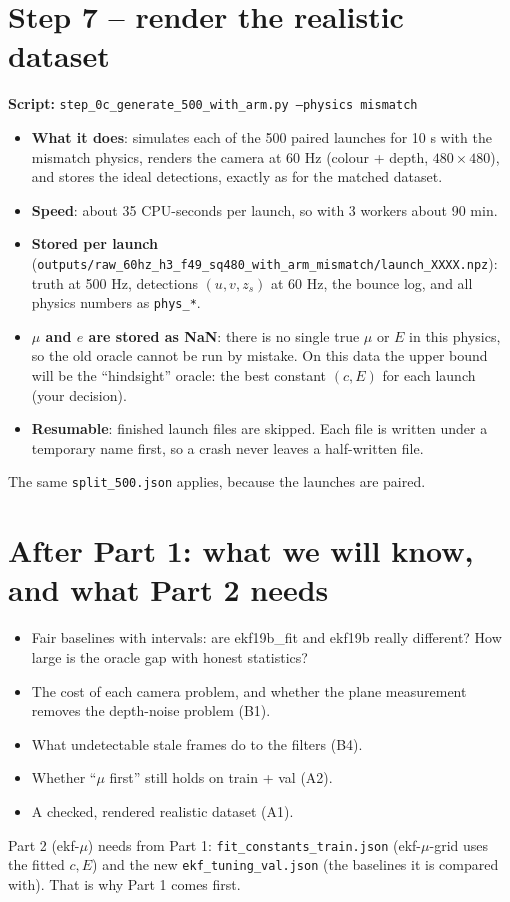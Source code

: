 \documentclass[11pt,a4paper]{article}
\begin{document}
\section{Step 7 -- render the realistic dataset}
\noindent\textbf{Script:} \texttt{step\_0c\_generate\_500\_with\_arm.py --physics mismatch}\par\medskip
\begin{itemize}
\item \textbf{What it does}: simulates each of the 500 paired launches for 10 s with the mismatch physics, renders the
  camera at 60 Hz (colour + depth, $480\times480$), and stores the ideal detections, exactly as for the matched dataset.
\item \textbf{Speed}: about 35 CPU-seconds per launch, so with 3 workers about 90 min.
\item \textbf{Stored per launch} (\nolinkurl{outputs/raw_60hz_h3_f49_sq480_with_arm_mismatch/launch_XXXX.npz}): truth at
  500 Hz, detections $(u,v,z_s)$ at 60 Hz, the bounce log, and all physics numbers as \texttt{phys\_*}.
\item \textbf{$\mu$ and $e$ are stored as NaN}: there is no single true $\mu$ or $E$ in this physics, so the old oracle cannot be
  run by mistake. On this data the upper bound will be the ``hindsight'' oracle: the best constant $(c,E)$ for each
  launch (your decision).
\item \textbf{Resumable}: finished launch files are skipped. Each file is written under a temporary name first, so a crash
  never leaves a half-written file.
\end{itemize}
The same \texttt{split\_500.json} applies, because the launches are paired.

\section{After Part 1: what we will know, and what Part 2 needs}
\begin{itemize}
\item Fair baselines with intervals: are ekf19b\_fit and ekf19b really different? How large is the oracle gap with honest
  statistics?
\item The cost of each camera problem, and whether the plane measurement removes the depth-noise problem (B1).
\item What undetectable stale frames do to the filters (B4).
\item Whether ``$\mu$ first'' still holds on train + val (A2).
\item A checked, rendered realistic dataset (A1).
\end{itemize}
Part 2 (ekf-$\mu$) needs from Part 1: \texttt{fit\_constants\_train.json} (ekf-$\mu$-grid uses the fitted $c,E$) and the
new \texttt{ekf\_tuning\_val.json} (the baselines it is compared with). That is why Part 1 comes first.
\end{document}
